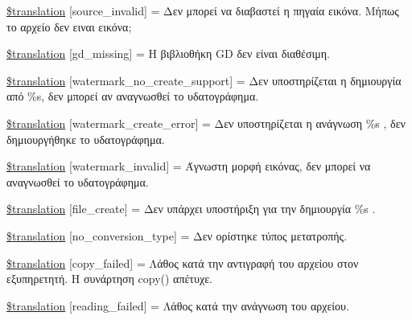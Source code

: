 \begin{DoxyCompactItemize}
\item 
\hyperlink{class_8upload_8el___g_r_8php_a6ab0a660b457eaf2d3434b225449fdd6}{\$translation} \mbox{[}\textquotesingle{}source\+\_\+invalid\textquotesingle{}\mbox{]} = \textquotesingle{}Δεν μπορεί να διαβαστεί η πηγαία εικόνα. Μήπως το αρχείο δεν ειναι εικόνα;\textquotesingle{}
\item 
\hyperlink{class_8upload_8el___g_r_8php_a7f3dfcc0db4bbc0f2e7210c439798e56}{\$translation} \mbox{[}\textquotesingle{}gd\+\_\+missing\textquotesingle{}\mbox{]} = \textquotesingle{}Η βιβλιοθήκη G\+D δεν είναι διαθέσιμη.\textquotesingle{}
\item 
\hyperlink{class_8upload_8el___g_r_8php_a82d5853430ab72dc1f9799ec36144cc6}{\$translation} \mbox{[}\textquotesingle{}watermark\+\_\+no\+\_\+create\+\_\+support\textquotesingle{}\mbox{]} = \textquotesingle{}Δεν υποστηρίζεται η δημιουργία από \%s, δεν μπορεί αν αναγνωσθεί το υδατογράφημα.\textquotesingle{}
\item 
\hyperlink{class_8upload_8el___g_r_8php_aabca0b65dadbc6184415c16375f284ca}{\$translation} \mbox{[}\textquotesingle{}watermark\+\_\+create\+\_\+error\textquotesingle{}\mbox{]} = \textquotesingle{}Δεν υποστηρίζεται η ανάγνωση \%s , δεν δημιουργήθηκε το υδατογράφημα.\textquotesingle{}
\item 
\hyperlink{class_8upload_8el___g_r_8php_ac336e7a5701e47ba4a05e9e498a3cc44}{\$translation} \mbox{[}\textquotesingle{}watermark\+\_\+invalid\textquotesingle{}\mbox{]} = \textquotesingle{}Άγνωστη μορφή εικόνας, δεν μπορεί να αναγνωσθεί το υδατογράφημα.\textquotesingle{}
\item 
\hyperlink{class_8upload_8el___g_r_8php_a1ecb4673e4fb69e06b3f20b65cecf30a}{\$translation} \mbox{[}\textquotesingle{}file\+\_\+create\textquotesingle{}\mbox{]} = \textquotesingle{}Δεν υπάρχει υποστήριξη για την δημιουργία \%s .\textquotesingle{}
\item 
\hyperlink{class_8upload_8el___g_r_8php_a4712d7ec28e9a7f17eb3338af2358363}{\$translation} \mbox{[}\textquotesingle{}no\+\_\+conversion\+\_\+type\textquotesingle{}\mbox{]} = \textquotesingle{}Δεν ορίστηκε τύπος μετατροπής.\textquotesingle{}
\item 
\hyperlink{class_8upload_8el___g_r_8php_a783c9358bcf54a054545b50098bc679b}{\$translation} \mbox{[}\textquotesingle{}copy\+\_\+failed\textquotesingle{}\mbox{]} = \textquotesingle{}Λάθος κατά την αντιγραφή του αρχείου στον εξυπηρετητή. Η συνάρτηση copy() απέτυχε.\textquotesingle{}
\item 
\hyperlink{class_8upload_8el___g_r_8php_a01bea14c9fd5f353f62db44beabfcd42}{\$translation} \mbox{[}\textquotesingle{}reading\+\_\+failed\textquotesingle{}\mbox{]} = \textquotesingle{}Λάθος κατά την ανάγνωση του αρχείου.\textquotesingle{}
\end{DoxyCompactItemize}


